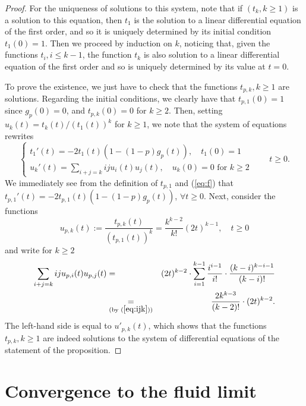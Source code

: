 \documentclass[a4, 11pt]{article}
\numberwithin{equation}{section}
\theoremstyle{plain}
\theoremstyle{definition}
\theoremstyle{remark}
\begin{document}
\begin{proof}
For the uniqueness of solutions to this system, note that if $(t_k,k\geq 1)$ is a solution to this equation, then $t_1$ is the solution to a linear differential equation of the first order, and so it is uniquely determined by its initial condition $t_1(0)=1$. Then we proceed by induction on $k$, noticing that, given the functions $t_i, i \leq k-1$, the function $t_k$ is also solution to a linear differential equation of the first order and so is uniquely determined by its value at $t=0$.

To prove the existence, we just have to check that the functions $t_{p,k}, k\geq 1$ are solutions. Regarding the initial conditions, we clearly have that $t_{p,1}(0)=1$ since $g_p(0)=0$, and $t_{p,k}(0)=0$ for $k\geq 2$. Then, setting $u_k(t)=t_k(t)/(t_1(t))^k$ for $k \geq 1$, we note that the system of equations rewrites
$$\left\{
	\begin{array}{ll}
	        t_1'(t)=-2t_1(t)(1-(1-p)g_p(t)), \quad t_1(0)=1 \\
		u_k'(t)=\sum_{i+j=k}iju_i(t)u_j(t), \quad u_k(0)=0 \text{ for }k\geq 2
	\end{array}
	\right. \qquad t\geq 0.$$
We immediately see from the definition of $t_{p,1}$ and (\ref{eq:f}) that $t_{p,1}'(t)=-2t_{p,1}(t)(1-(1-p)g_p(t))$, $\forall t \geq 0$. Next, consider the functions
$$
u_{p,k}(t):=\frac{t_{p,k}(t)}{(t_{p,1}(t))^k}=\frac{k^{k-2}}{k!}\left(2t\right)^{k-1}, \quad t \geq 0
$$
and write for $k\geq 2$
\begin{eqnarray*}
\sum_{i+j=k}iju_{p,i}(t)u_{p,j}(t)&=& (2t)^{k-2} \cdot \sum_{i=1}^{k-1}\frac{i^{i-1}}{i!} \cdot \frac{(k-i)^{k-i-1}}{(k-i)!}  \\
&\underset{(\text{by }(\ref{eq:ijk}))}=& \frac{2 k^{k-3}}{(k-2)!} \cdot (2t)^{k-2}.
\end{eqnarray*}
The left-hand side is equal to $u'_{p,k}(t)$, which shows that the functions $t_{p,k},k\geq 1$ are indeed solutions to the system of differential equations of the statement of the proposition.
\end{proof}

\section{Convergence to the fluid limit}
\label{sec:mise_en_place}	
	
\end{document}
